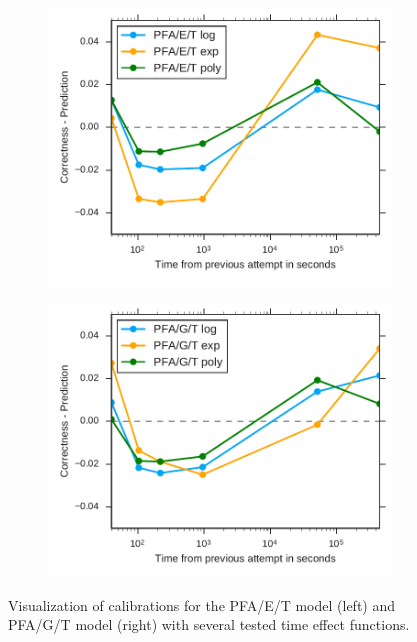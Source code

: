 \begin{figure}[htbp]
  \centering
  \begin{subfigure}{.49\textwidth}
    \centering
    \includegraphics[width=\textwidth]{img/calibration-pfaet}
    \caption{}
    \label{fig:calibration-pfaet}
  \end{subfigure}
  \begin{subfigure}{.49\textwidth}
    \centering
    \includegraphics[width=\textwidth]{img/calibration-pfagt}
    \caption{}
    \label{fig:calibration-pfagt}
  \end{subfigure}
  \caption{Visualization of calibrations for the PFA/E/T model (left) and PFA/G/T model (right) with several tested time effect functions.}
  \label{fig:calibration2}
\end{figure}

